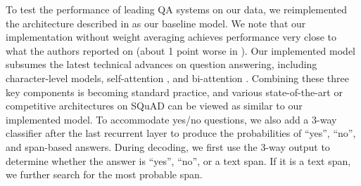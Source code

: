 To test the performance of leading QA systems on our data, we reimplemented the architecture described in \citet{clark2017simple} as our baseline model. We note that our implementation without weight averaging achieves performance very close to what the authors reported on \squad{} (about 1 point worse in \fone{}). Our implemented model subsumes the latest technical advances on question answering, including character-level models, self-attention \cite{wang2017gated}, and bi-attention \cite{seo2016bidirectional}.
Combining these three key components is becoming standard practice, and various state-of-the-art or competitive architectures \cite{liu2017stochastic,clark2017simple,wang2017gated,seo2016bidirectional,pan2017memen,salant2017contextualized,xiong2017dcn+} on SQuAD can be viewed as similar to our implemented model.
To accommodate yes/no questions, we also add a 3-way classifier after the last recurrent layer to produce the probabilities of ``yes'', ``no'', and span-based answers.
During decoding, we first use the 3-way output to determine whether the answer is ``yes'', ``no'', or a text span. If it is a text span, we further search for the most probable span.

